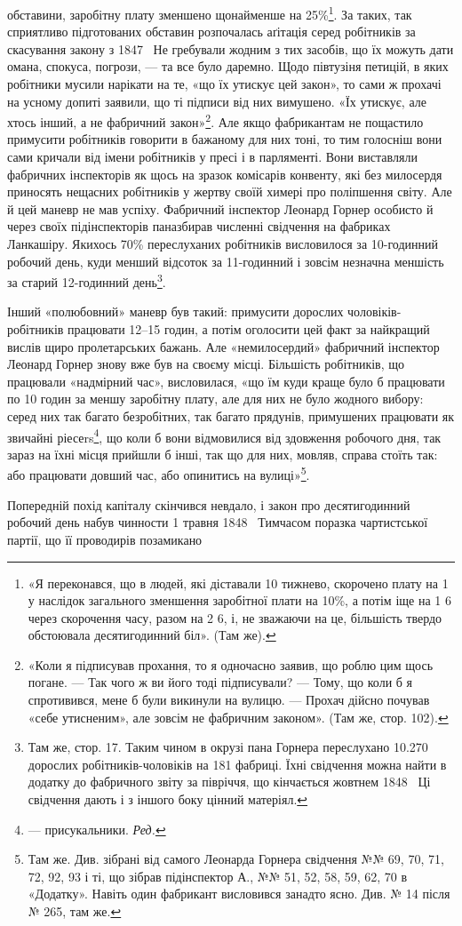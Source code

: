 \parcont{}  %
обставини, заробітну плату зменшено щонайменше на 25\%\footnote{
«Я переконався, що в людей, які діставали 10 тижнево,
скорочено плату на 1 у наслідок загального зменшення заробітної
плати на 10\%, а потім іще на 1 6 через скорочення часу,
разом на 2 6, і, не зважаючи на це, більшість твердо обстоювала
десятигодинний біл». (Там же).
}.
За таких, так сприятливо підготованих обставин розпочалась
аґітація серед робітників за скасування закону з 1847~ Не гребували
жодним з тих засобів, що їх можуть дати омана, спокуса,
погрози, — та все було даремно. Щодо півтузіня петицій, в яких
робітники мусили нарікати на те, «що їх утискує цей закон», то
сами ж прохачі на усному допиті заявили, що ті підписи від них
вимушено. «Їх утискує, але хтось інший, а не фабричний закон»\footnote{
«Коли я підписував прохання, то я одночасно заявив, що роблю
цим щось погане. — Так чого ж ви його тоді підписували? — Тому, що коли б
я спротивився, мене б були викинули на вулицю. — Прохач дійсно почував
«себе утисненим», але зовсім не фабричним законом». (Там же, стор. 102).
}.
Але якщо фабрикантам не пощастило примусити робітників
говорити в бажаному для них тоні, то тим голосніш вони сами
кричали від імени робітників у пресі і в парляменті. Вони виставляли
фабричних інспекторів як щось на зразок комісарів конвенту,
які без милосердя приносять нещасних робітників у жертву
своїй химері про поліпшення світу. Але й цей маневр не мав
успіху. Фабричний інспектор Леонард Горнер особисто й через
своїх підінспекторів паназбирав численні свідчення на фабриках
Ланкашіру. Якихось 70\% переслуханих робітників висловилося
за 10-годинний робочий день, куди менший відсоток за 11-годинний
і зовсім незначна меншість за старий 12-годинний день\footnote{
Там же, стор. 17. Таким чином в окрузі пана Горнера переслухано
\num{10.270} дорослих робітників-чоловіків на 181 фабриці. Їхні свідчення
можна найти в додатку до фабричного звіту за півріччя, що кінчається
жовтнем 1848~ Ці свідчення дають і з іншого боку цінний матеріял.
}.

Інший «полюбовний» маневр був такий: примусити дорослих
чоловіків-робітників працювати 12--15 годин, а потім оголосити
цей факт за найкращий вислів щиро пролетарських бажань.
Але «немилосердий» фабричний інспектор Леонард Горнер знову
вже був на своєму місці. Більшість робітників, що працювали
«надмірний час», висловилася, «що їм куди краще було б працювати
по 10 годин за меншу заробітну плату, але для них не було
жодного вибору: серед них так багато безробітних, так багато
прядунів, примушених працювати як звичайні ріесеrs\footnote*{
— присукальники. \emph{Ред.}
}, що
коли б вони відмовилися від здовження робочого дня, так зараз
на їхні місця прийшли б інші, так що для них, мовляв, справа
стоїть так: або працювати довший час, або опинитись на вулиці»\footnote{
Там же. Див. зібрані від самого Леонарда Горнера свідчення
№№ 69, 70, 71, 72, 92, 93 і ті, що зібрав підінспектор А., №№ 51, 52,
58, 59, 62, 70 в «Додатку». Навіть один фабрикант висловився занадто
ясно. Див. № 14 після № 265, там же.
}.

Попередній похід капіталу скінчився невдало, і закон про десятигодинний
робочий день набув чинности 1 травня 1848~ Тимчасом
поразка чартистської партії, що її проводирів позамикано
\parbreak{}  %
